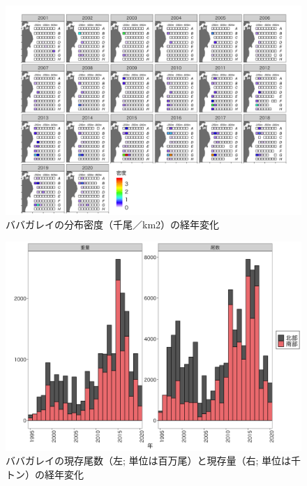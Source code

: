 \documentclass[11pt]{article} %
\begin{document}
\begin{linenumbers}
\begin{figure}[h]
  \centering
  \includegraphics[width = 14cm]{ババガレイdens.png}
  \caption{ババガレイの分布密度（千尾／km2）の経年変化}
\end{figure}

\begin{figure}[h]
  \centering
  \includegraphics[width = 14cm]{ババガレイtrend.png}
  \caption{ババガレイの現存尾数（左; 単位は百万尾）と現存量（右; 単位は千トン）の経年変化}
\end{figure}


\end{linenumbers}
\end{document}
